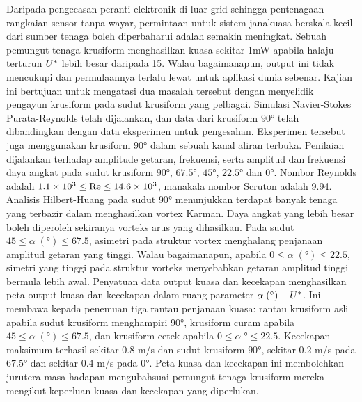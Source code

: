 \documentclass[oneside]{utmthesis}
\begin{document}
\begin{abstrak}
  Daripada pengecasan peranti elektronik di luar grid sehingga pentenagaan rangkaian sensor tanpa wayar, permintaan untuk sistem janakuasa berskala kecil dari sumber tenaga boleh diperbaharui adalah semakin meningkat. Sebuah pemungut tenaga krusiform menghasilkan kuasa sekitar 1mW apabila halaju terturun $U^{*}$ lebih besar daripada 15. Walau bagaimanapun, output ini tidak mencukupi dan permulaannya terlalu lewat untuk aplikasi dunia sebenar. Kajian ini bertujuan untuk mengatasi dua masalah tersebut dengan menyelidik pengayun krusiform pada sudut krusiform yang pelbagai. Simulasi Navier-Stokes Purata-Reynolds telah dijalankan, dan data dari krusiform $90 \si{\degree}$ telah dibandingkan dengan data eksperimen untuk pengesahan. Eksperimen tersebut juga menggunakan krusiform $90 \si{\degree}$ dalam sebuah kanal aliran terbuka. Penilaian dijalankan terhadap amplitude getaran, frekuensi, serta amplitud dan frekuensi daya angkat pada sudut krusiform $90 \si{\degree}$, $67.5 \si{\degree}$, $45 \si{\degree}$, $22.5 \si{\degree}$ dan $0 \si{\degree}$. Nombor Reynolds adalah $1.1 \times 10^{3} \leq \text{Re} \leq 14.6 \times 10^{3}$, manakala nombor Scruton adalah 9.94. Analisis Hilbert-Huang pada sudut $90 \si{\degree}$ menunjukkan terdapat banyak tenaga yang terbazir dalam menghasilkan vortex Karman. Daya angkat yang lebih besar boleh diperoleh sekiranya vorteks arus yang dihasilkan. Pada sudut $45 \leq \alpha \; (\si{\degree}) \leq 67.5$, asimetri pada struktur vortex menghalang penjanaan amplitud getaran yang tinggi. Walau bagaimanapun, apabila $0 \leq \alpha \; (\si{\degree}) \leq 22.5$, simetri yang tinggi pada struktur vorteks menyebabkan getaran amplitud tinggi bermula lebih awal. Penyatuan data output kuasa dan kecekapan menghasilkan peta output kuasa dan kecekapan dalam ruang parameter $\alpha \; (\si{\degree})-\ured$. Ini membawa kepada penemuan tiga rantau penjanaan kuasa: rantau krusiform asli apabila sudut krusiform menghampiri $90 \si{\degree}$, krusiform curam apabila $45 \leq \alpha \; (\si{\degree}) \leq 67.5$, dan krusiform cetek apabila $0 \leq \alpha \; \si{\degree} \leq 22.5$. Kecekapan maksimum terhasil sekitar 0.8 m/s dan sudut krusiform $90 \si{\degree}$, sekitar 0.2 m/s pada $67.5 \si{\degree}$ dan sekitar 0.4 m/s pada $0 \si{\degree}$. Peta kuasa dan kecekapan ini membolehkan jurutera masa hadapan mengubahsuai pemungut tenaga krusiform mereka mengikut keperluan kuasa dan kecekapan yang diperlukan.


\end{abstrak}
\end{document}
